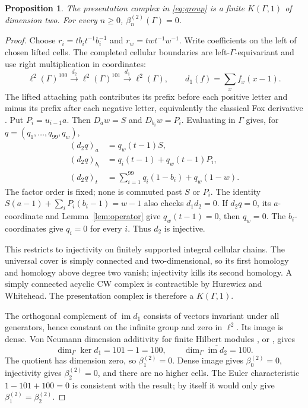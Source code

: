 \documentclass[11pt]{article}
\newcommand{\betti}[1]{\beta_{#1}^{(2)}}
\newtheorem{proposition}[theorem]{Proposition}
\theoremstyle{remark}\newtheorem{remark}[theorem]{Remark}
\begin{document}
\begin{proposition}\label{prop:direct}
The presentation complex in \eqref{eq:group} is a finite $K(\Gamma,1)$ of dimension two. For every $n\geq0$, $\betti n(\Gamma)=0$.
\end{proposition}
\begin{proof}
Choose $r_i=tb_it^{-1}b_i^{-1}$ and $r_w=twt^{-1}w^{-1}$. Write coefficients on the left of chosen lifted cells. The completed cellular boundaries are left-$\Gamma$-equivariant and use right multiplication in coordinates:
\[
 \ell^2(\Gamma)^{100}\xrightarrow{d_2}\ell^2(\Gamma)^{101}
 \xrightarrow{d_1}\ell^2(\Gamma),\qquad d_1(f)=\sum_x f_x(x-1).
\]
The lifted attaching path contributes its prefix before each positive letter and minus its prefix after each negative letter, equivalently the classical Fox derivative \cite{fox}. Put $P_i=u_{i-1}a$. Then $D_aw=S$ and $D_{b_i}w=P_i$. Evaluating in $\Gamma$ gives, for $q=(q_1,\ldots,q_{99},q_w)$,
\begin{align*}
 (d_2q)_a&=q_w(t-1)S,\\
 (d_2q)_{b_i}&=q_i(t-1)+q_w(t-1)P_i,\\
 (d_2q)_t&=\sum_{i=1}^{99}q_i(1-b_i)+q_w(1-w).
\end{align*}
The factor order is fixed; none is commuted past $S$ or $P_i$. The identity $S(a-1)+\sum_iP_i(b_i-1)=w-1$ also checks $d_1d_2=0$. If $d_2q=0$, its $a$-coordinate and Lemma~\ref{lem:operator} give $q_w(t-1)=0$, then $q_w=0$. The $b_i$-coordinates give $q_i=0$ for every $i$. Thus $d_2$ is injective.

This restricts to injectivity on finitely supported integral cellular chains. The universal cover is simply connected and two-dimensional, so its first homology and homology above degree two vanish; injectivity kills its second homology. A simply connected acyclic CW complex is contractible by Hurewicz and Whitehead. The presentation complex is therefore a $K(\Gamma,1)$.

The orthogonal complement of $\operatorname{im}d_1$ consists of vectors invariant under all generators, hence constant on the infinite group and zero in $\ell^2$. Its image is dense. Von Neumann dimension additivity for finite Hilbert modules \cite[Properties~1.2(1),(3), p.~106]{gab02}, or \cite[Theorem~1.11 and \S2.3]{lueck}, gives
\[
 \dim_\Gamma\ker d_1=101-1=100,\qquad
 \dim_\Gamma\overline{\operatorname{im}d_2}=100.
\]
The quotient has dimension zero, so $\betti1=0$. Dense image gives $\betti0=0$, injectivity gives $\betti2=0$, and there are no higher cells. The Euler characteristic $1-101+100=0$ is consistent with the result; by itself it would only give $\betti1=\betti2$.
\end{proof}
\end{document}
